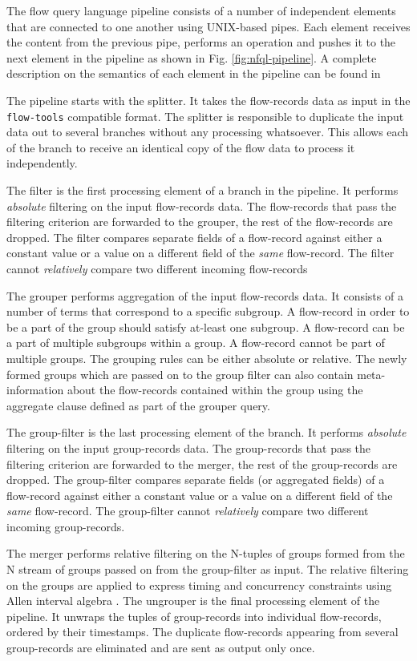 The flow query language pipeline consists of a number of independent elements
that are connected to one another using UNIX-based pipes.  Each element
receives the content from the previous pipe, performs an operation and pushes
it to the next element in the pipeline as shown in Fig.
\ref{fig:nfql-pipeline}. A complete description on the semantics of each
element in the pipeline can be found in \cite{vmarinov:2009}

The pipeline starts with the splitter. It takes the flow-records data as input
in the \texttt{flow-tools} compatible format. The splitter is responsible to
duplicate the input data out to several branches without any processing
whatsoever. This allows each of the branch to receive an identical copy of the
flow data to process it independently.

The filter is the first processing element of a branch in the pipeline.  It
performs \emph{absolute} filtering on the input flow-records data.  The
flow-records that pass the filtering criterion are forwarded to the grouper,
the rest of the flow-records are dropped. The filter compares separate fields
of a flow-record against either a constant value or a value on a different
field of the \emph{same} flow-record. The filter cannot \emph{relatively}
compare two different incoming flow-records

The grouper performs aggregation of the input flow-records data. It consists
of a number of terms that correspond to a specific subgroup. A flow-record in
order to be a part of the group should satisfy at-least one subgroup. A
flow-record can be a part of multiple subgroups within a group. A flow-record
cannot be part of multiple groups.  The grouping rules can be either absolute
or relative. The newly formed groups which are passed on to the group filter
can also contain meta-information about the flow-records contained within the
group using the aggregate clause defined as part of the grouper query.

The group-filter is the last processing element of the branch. It performs
\emph{absolute} filtering on the input group-records data. The group-records
that pass the filtering criterion are forwarded to the merger, the rest of the
group-records are dropped. The group-filter compares separate fields (or
aggregated fields) of a flow-record against either a constant value or a value
on a different field of the \emph{same} flow-record. The group-filter cannot
\emph{relatively} compare two different incoming group-records.

The merger performs relative filtering on the N-tuples of groups formed from
the N stream of groups passed on from the group-filter as input. The relative
filtering on the groups are applied to express timing and concurrency
constraints using Allen interval algebra \cite{fallen:1983}. The ungrouper is
the final processing element of the pipeline. It unwraps the tuples of
group-records into individual flow-records, ordered by their timestamps. The
duplicate flow-records appearing from several group-records are eliminated and
are sent as output only once.
